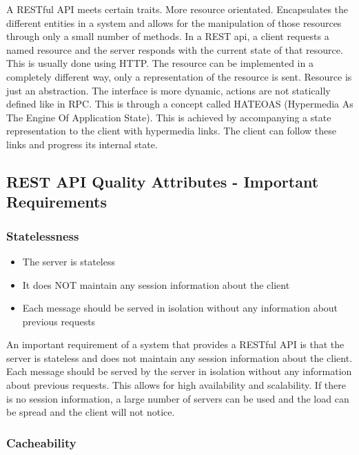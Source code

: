 
A RESTful API meets certain traits.
More resource orientated.
Encapsulates the different entities in a system and allows for the manipulation of those resources through only a small number of methods.
In a REST api, a client requests a named resource and the server responds with the current state of that resource.
This is usually done using HTTP. The resource can be implemented in a completely different way, only a representation of the resource is sent.
Resource is just an abstraction.
The interface is more dynamic, actions are not statically defined like in RPC.
This is through a concept called HATEOAS (Hypermedia As The Engine Of Application State).
This is achieved by accompanying a state representation to the client with hypermedia links.
The client can follow these links and progress its internal state.

\subsection{REST API Quality Attributes - Important Requirements}

\subsubsection{Statelessness}
\begin{itemize}
    \item The server is stateless
    \item It does NOT maintain any session information about the client
    \item Each message should be served in isolation without any information about previous requests
\end{itemize}

An important requirement of a system that provides a RESTful API is that the server is stateless and does not maintain any session information about the client.
Each message should be served by the server in isolation without any information about previous requests.
This allows for high availability and scalability.
If there is no session information, a large number of servers can be used and the load can be spread and the client will not notice.

\subsubsection{Cacheability}

